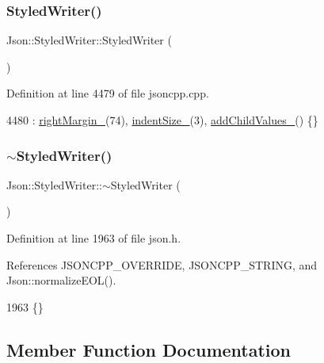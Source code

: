 \subsubsection{\texorpdfstring{Styled\+Writer()}{StyledWriter()}}
{\footnotesize\ttfamily Json\+::\+Styled\+Writer\+::\+Styled\+Writer (\begin{DoxyParamCaption}{ }\end{DoxyParamCaption})}



Definition at line 4479 of file jsoncpp.\+cpp.


\begin{DoxyCode}
4480     : \hyperlink{class_json_1_1_styled_writer_ae648d2e1fc0f7d45c748c96805106cb0}{rightMargin\_}(74), \hyperlink{class_json_1_1_styled_writer_a0b5ab768cc56433d463eb1f03da8614e}{indentSize\_}(3), \hyperlink{class_json_1_1_styled_writer_acaabfa48b50a8bb7fa9ce98e2ae971d9}{addChildValues\_}() \{\}
\end{DoxyCode}
\mbox{\label{class_json_1_1_styled_writer_a6a18380a4c5dd5e37a892dc182aac88c}} 
\subsubsection{\texorpdfstring{$\sim$\+Styled\+Writer()}{~StyledWriter()}}
{\footnotesize\ttfamily Json\+::\+Styled\+Writer\+::$\sim$\+Styled\+Writer (\begin{DoxyParamCaption}{ }\end{DoxyParamCaption})\hspace{0.3cm}{\ttfamily [inline]}}



Definition at line 1963 of file json.\+h.



References J\+S\+O\+N\+C\+P\+P\+\_\+\+O\+V\+E\+R\+R\+I\+DE, J\+S\+O\+N\+C\+P\+P\+\_\+\+S\+T\+R\+I\+NG, and Json\+::normalize\+E\+O\+L().


\begin{DoxyCode}
1963 \{\}
\end{DoxyCode}


\subsection{Member Function Documentation}
\mbox{\label{class_json_1_1_styled_writer_a37a806d010f708cb68556f2666f79bdf}} 

